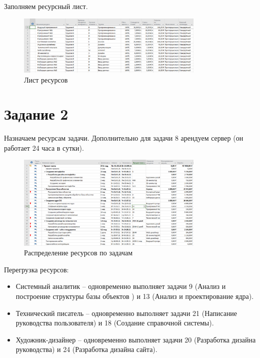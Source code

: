 Заполняем ресурсный лист.

\begin{figure}[H]
	\centering
	\includegraphics[width=0.8\textwidth]{img/content/resources.png}
	\caption{Лист ресурсов}
\end{figure}

\section{Задание 2}

Назначаем ресурсам задачи. Дополнительно для задачи 8 арендуем сервер (он работает 24 часа в сутки).

\begin{figure}[H]
	\centering
	\includegraphics[width=0.8\textwidth]{img/content/resources_tasks.png}
	\caption{Распределение ресурсов по задачам}
\end{figure}

Перегрузка ресурсов:

\begin{itemize}
	\item Системный аналитик – одновременно выполняет задачи 9 (Анализ и построение структуры базы объектов ) и 13 (Анализ и проектирование ядра).
	\item Технический писатель – одновременно выполняет задачи 21 (Написание руководства пользователя) и 18 (Создание справочной системы).
	\item Художник-дизайнер – одновременно выполняет задачи 20 (Разработка дизайна руководства) и 24 (Разработка дизайна сайта).
\end{itemize}

